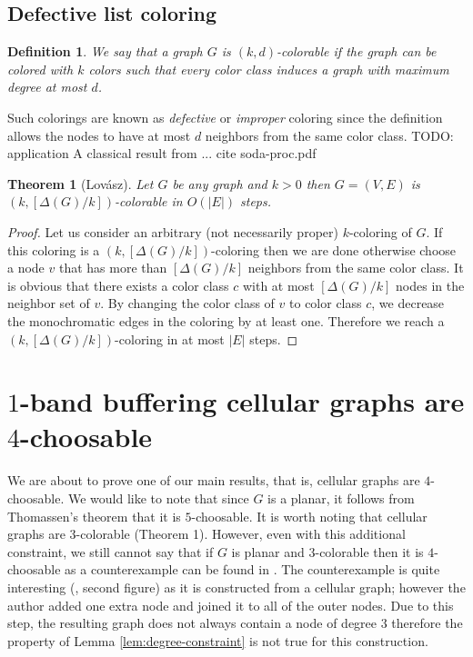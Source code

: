 \documentclass[a4paper, 12pt]{article}
\newtheorem{theo}[lem]{Theorem}
\newtheorem{defin}[lem]{Definition}
\begin{document}
\subsection{Defective list coloring}

\begin{defin} We say that a graph $G$ is $(k,d)$-colorable if the graph can be colored with $k$ colors such that every color class induces a graph with maximum degree at most $d$.
\end{defin}

Such colorings are known as \textit{defective} or \textit{improper} coloring since the definition allows the nodes to have at most $d$ neighbors from the same color class. TODO: application
A classical result from ... cite soda-proc.pdf
\begin{theo}[Lovász]
Let $G$ be any graph and $k > 0$ then $G=(V,E)$ is $(k,[\Delta(G)/k])$-colorable in $O(|E|)$ steps.
\end{theo}
\begin{proof} Let us consider an arbitrary (not necessarily proper) $k$-coloring of $G$. If this coloring is a $(k,[\Delta(G)/k])$-coloring then we are done otherwise choose a node $v$ that has more than $[\Delta(G)/k]$ neighbors from the same color class. It is obvious that there exists a color class $c$ with at most $[\Delta(G)/k]$ nodes in the neighbor set of $v$. By changing the color class of $v$ to color class $c$, we decrease the monochromatic edges in the coloring by at least one. Therefore we reach a $(k,[\Delta(G)/k])$-coloring in at most $|E|$ steps.
\end{proof}

\section{$1$-band buffering cellular graphs are $4$-choosable}\label{sec:4-choosable}

We are about to prove one of our main results, that is, cellular graphs are $4$-choosable. We would like to note that since $G$ is a planar, it follows from Thomassen's theorem \cite{Thomassen:1994:PG:184180.184192} that it is $5$-choosable. It is worth noting that cellular graphs are $3$-colorable \cite{662943} (Theorem 1). However, even with this additional constraint, we still cannot say that if $G$ is planar and $3$-colorable then it is $4$-choosable as a counterexample can be found in \cite{JGT:JGT4}. The counterexample is quite interesting (\cite {JGT:JGT4}, second figure) as it is constructed from a cellular graph; however the author added one extra node and joined it to all of the outer nodes. Due to this step, the resulting graph does not always contain a node of degree $3$ therefore the property of Lemma \ref{lem:degree-constraint} is not true for this construction.
\end{document}
